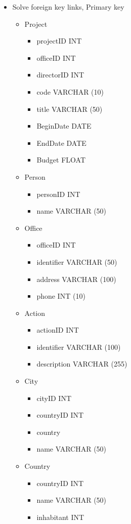 \documentclass[13pt,a4paper]{report}
\begin{document}
\begin{itemize}
\item Solve foreign key links, Primary key
	\begin{itemize}
	\item Project
		\begin{itemize}
		\item projectID INT
		\item officeID INT
		\item directorID INT
		\item code VARCHAR (10)
		\item title VARCHAR (50)
		\item BeginDate DATE
		\item EndDate DATE
		\item Budget FLOAT
		\end{itemize}
	\item Person
		\begin{itemize}
		\item personID INT
		\item name VARCHAR (50)
		\end{itemize}
	\item Office
		\begin{itemize}
		\item officeID INT
		\item identifier VARCHAR (50)
		\item address VARCHAR (100)
		\item phone INT (10)
		\end{itemize}
	\item Action
		\begin{itemize}
		\item actionID INT
		\item identifier VARCHAR (100)
		\item description VARCHAR (255)
		\end{itemize}
	\item City
		\begin{itemize}
		\item cityID INT
		\item countryID INT
		\item country
		\item name VARCHAR (50)
		\end{itemize}
	\item Country
		\begin{itemize}
		\item countryID INT
		\item name VARCHAR (50)
		\item inhabitant INT

\end{itemize}
\end{itemize}
\end{itemize}
\end{document}
